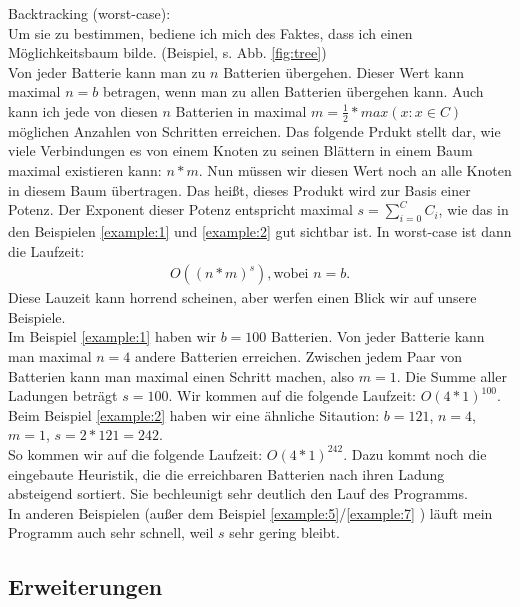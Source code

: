 \documentclass[a4paper,10pt,ngerman]{scrartcl}
\begin{document}
Backtracking (worst-case):\\
Um sie zu bestimmen, bediene ich mich des Faktes, dass ich
einen Möglichkeitsbaum bilde. (Beispiel, s. Abb. \ref{fig:tree})\\
Von jeder Batterie kann man zu $n$ Batterien übergehen.
Dieser Wert kann maximal $n = b$ betragen, wenn man zu allen Batterien übergehen kann.
Auch kann ich jede von diesen $n$ Batterien in maximal $m = \frac{1}{2}*max(x: x \in C)$
möglichen Anzahlen von Schritten erreichen.
Das folgende Prdukt stellt dar, wie viele Verbindungen es von einem Knoten zu seinen Blättern in einem Baum maximal existieren kann: $n * m$.
Nun müssen wir diesen Wert noch an alle Knoten in diesem Baum übertragen. Das heißt, dieses Produkt wird zur Basis einer Potenz.
Der Exponent dieser Potenz entspricht maximal $s = \sum_{i=0}^C{C_i}$, wie das in den Beispielen \ref{example:1} und \ref{example:2} gut
sichtbar ist. In worst-case ist dann die Laufzeit:
\begin{align*}
O((n*m)^s), \text{wobei } n = b.
\end{align*}
Diese Lauzeit kann horrend scheinen, aber werfen einen Blick wir auf unsere Beispiele.\\
Im Beispiel \ref{example:1} haben wir $b = 100$ Batterien. Von jeder Batterie kann man maximal $n = 4$ andere Batterien erreichen.
Zwischen jedem Paar von Batterien kann man maximal einen Schritt machen, also $m = 1$. Die Summe aller Ladungen beträgt $s=100$.
Wir kommen auf die folgende Laufzeit: $O(4 * 1)^{100}$.\\
Beim Beispiel \ref{example:2} haben wir eine ähnliche Sitaution: $b = 121$, $n = 4$, $m = 1$, $s = 2* 121 = 242$.\\
So kommen wir auf die folgende Laufzeit: $O(4 * 1)^{242}$.
Dazu kommt noch die eingebaute Heuristik, die die erreichbaren Batterien nach ihren Ladung absteigend sortiert.
Sie bechleunigt sehr deutlich den Lauf des Programms.\\
In anderen Beispielen (außer dem Beispiel \ref{example:5}/\ref{example:7} ) läuft mein Programm auch sehr schnell, weil $s$ sehr gering bleibt. 


\subsection{Erweiterungen}
\end{document}
